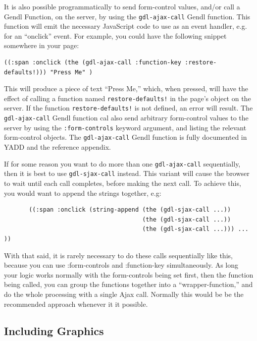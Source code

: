 \documentclass [11pt]{book}
\begin{document}
It is also possible programmatically to send form-control
      values, and/or call a Gendl Function, on the server, by
      using the \texttt{gdl-ajax-call} Gendl function. This function will emit the necessary
	  JavaScript code to use as an event handler, e.g. for an
	  ``onclick'' event. For example, you could have the following snippet somewhere in your page:

\begin{verbatim}((:span :onclick (the (gdl-ajax-call :function-key :restore-defaults!))) "Press Me" )
\end{verbatim}This will produce a piece of text ``Press Me,'' which,
	  when pressed, will have the effect of calling a function named \texttt{restore-defaults!} in the page's object on the server. If the function \texttt{restore-defaults!} is not defined, an error will result. The \texttt{gdl-ajax-call} Gendl function cal also send arbitrary form-control values
	  to the server by using the \texttt{:form-controls} keyword argument, and listing the relevant form-control objects. The \texttt{gdl-ajax-call} Gendl function is fully documented in YADD and the reference appendix.



If for some reason you want to do more than one \texttt{gdl-ajax-call} sequentially, then it is best to use \texttt{gdl-sjax-call} instead. This variant will cause the browser to wait until
	  each call completes, before making the next call. To achieve
	  this, you would want to append the strings together, e.g:

\begin{verbatim}
       ((:span :onclick (string-append (the (gdl-sjax-call ...))  
                                       (the (gdl-sjax-call ...)) 
                                       (the (gdl-sjax-call ...))) ... ))
\end{verbatim}With that said, it is rarely necessary to do these calls
	  sequentially like this, because you can use :form-controls
	  and :function-key simultaneously. As long your logic works
	  normally with the form-controls being set first, then the
	  function being called, you can group the functions together
	  into a ``wrapper-function,'' and do the whole processing
	  with a single Ajax call. Normally this would be be the
	  recommended approach whenever it it possible.



\subsection{Including Graphics}
\end{document}
